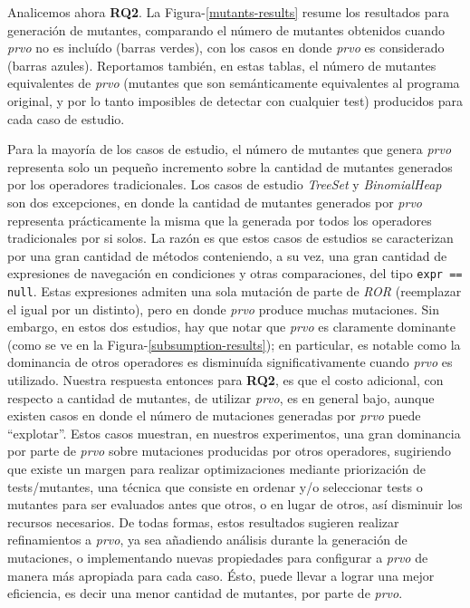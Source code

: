 Analicemos ahora \textbf{RQ2}. La Figura-\ref{mutants-results} resume los resultados para generaci\'on de mutantes, comparando el n\'umero de mutantes obtenidos cuando \emph{prvo} no es inclu\'ido (barras verdes), con los casos en donde \emph{prvo} es considerado (barras azules). Reportamos tambi\'en, en estas tablas, el n\'umero de mutantes equivalentes de \emph{prvo} (mutantes que son sem\'anticamente equivalentes al programa original, y por lo tanto imposibles de detectar con cualquier test) producidos para cada caso de estudio.

Para la mayor\'ia de los casos de estudio, el n\'umero de mutantes que genera \emph{prvo} representa solo un peque\~no incremento sobre la cantidad de mutantes generados por los operadores tradicionales. Los casos de estudio \emph{TreeSet} y \emph{BinomialHeap} son dos excepciones, en donde la cantidad de mutantes generados por \emph{prvo} representa pr\'acticamente la misma que la generada por todos los operadores tradicionales por si solos. La raz\'on es que estos casos de estudios se caracterizan por una gran cantidad de m\'etodos conteniendo, a su vez, una gran cantidad de expresiones de navegaci\'on en condiciones y otras comparaciones, del tipo \texttt{expr == null}. Estas expresiones admiten una sola mutaci\'on de parte de \emph{ROR} (reemplazar el igual por un distinto), pero en donde \emph{prvo} produce muchas mutaciones. Sin embargo, en estos dos estudios, hay que notar que \emph{prvo} es claramente dominante (como se ve en la Figura-\ref{subsumption-results}); en particular, es notable como la dominancia de otros operadores es disminu\'ida significativamente cuando \emph{prvo} es utilizado. Nuestra respuesta entonces para \textbf{RQ2}, es que el costo adicional, con respecto a cantidad de mutantes, de utilizar \emph{prvo}, es en general bajo, aunque existen casos en donde el n\'umero de mutaciones generadas por \emph{prvo} puede ``explotar''. Estos casos muestran, en nuestros experimentos, una gran dominancia por parte de \emph{prvo} sobre mutaciones producidas por otros operadores, sugiriendo que existe un margen para realizar optimizaciones mediante priorizaci\'on de tests/mutantes, una t\'ecnica que consiste en ordenar y/o seleccionar tests o mutantes para ser evaluados antes que otros, o en lugar de otros, as\'i disminuir los recursos necesarios. De todas formas, estos resultados sugieren realizar refinamientos a \emph{prvo}, ya sea a\~nadiendo an\'alisis durante la generaci\'on de mutaciones, o implementando nuevas propiedades para configurar a \emph{prvo} de manera m\'as apropiada para cada caso. \'Esto, puede llevar a lograr una mejor eficiencia, es decir una menor cantidad de mutantes, por parte de \emph{prvo}.


